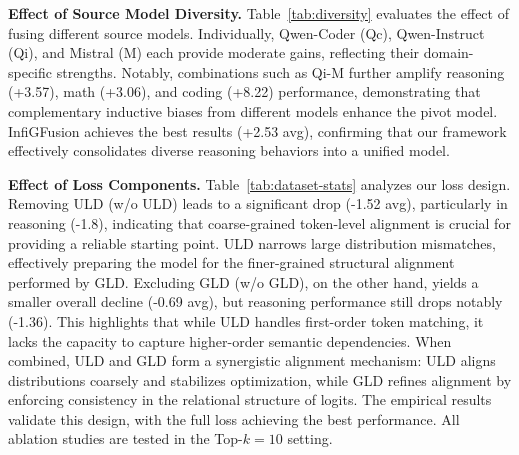 \documentclass{article}
\begin{document}
\textbf{Effect of Source Model Diversity.}
Table~\ref{tab:diversity} evaluates the effect of fusing different source models. Individually, Qwen-Coder (Qc), Qwen-Instruct (Qi), and Mistral (M) each provide moderate gains, reflecting their domain-specific strengths. Notably, combinations such as Qi-M further amplify reasoning (+3.57), math (+3.06), and coding (+8.22) performance, demonstrating that complementary inductive biases from different models enhance the pivot model. InfiGFusion achieves the best results (+2.53 avg), confirming that our framework effectively consolidates diverse reasoning behaviors into a unified model.


\begin{table}
\renewcommand\arraystretch{1.2}
\setlength{\tabcolsep}{4.5pt}
\begin{center}
\Huge
\vspace{-1em}
\vspace{-0.3em}
\caption{\footnotesize Ablation study on loss components.}
\label{tab:dataset-stats}
\end{center}
\vspace{-1.5em}
\end{table}

\textbf{Effect of Loss Components.}
Table~\ref{tab:dataset-stats} analyzes our loss design. Removing ULD (w/o ULD) leads to a significant drop (-1.52 avg), particularly in reasoning (-1.8), indicating that coarse-grained token-level alignment is crucial for providing a reliable starting point. ULD narrows large distribution mismatches, effectively preparing the model for the finer-grained structural alignment performed by GLD. Excluding GLD (w/o GLD), on the other hand, yields a smaller overall decline (-0.69 avg), but reasoning performance still drops notably (-1.36). This highlights that while ULD handles first-order token matching, it lacks the capacity to capture higher-order semantic dependencies. When combined, ULD and GLD form a synergistic alignment mechanism: ULD aligns distributions coarsely and stabilizes optimization, while GLD refines alignment by enforcing consistency in the relational structure of logits. The empirical results validate this design, with the full loss achieving the best performance. All ablation studies are tested in the Top-$k=10$ setting.
\vspace{-3mm}
\end{document}
